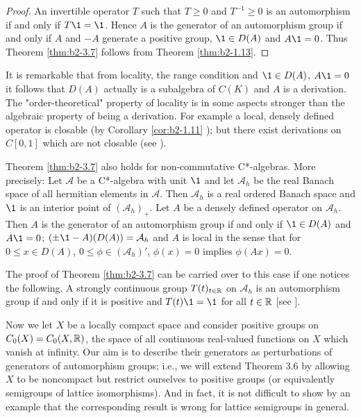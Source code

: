 \begin{proof}
An invertible operator $T$ such that $T \geq 0$ and $T^{-1} \geq 0$ is an automorphism if and only if $T\1 = \1$.
Hence $A$ is the generator of an automorphism group if and only if $A$ and $-A$ generate a positive group, $\1 \in D(A)$ and $A\1 = 0$.
Thus Theorem \ref{thm:b2-3.7} follows from Theorem \ref{thm:b2-1.13}.
\end{proof}

\begin{remark*}\label{rem:b2-3.7a}
It is remarkable that from locality, the range condition and $\1 \in D(A)$, $A\1 = 0$ it follows that $D(A)$ actually is a subalgebra of $C(K)$ and $A$ is a derivation.
The "order-theoretical" property of locality is in some aspects stronger than the algebraic property of being a derivation.
For example a local, densely defined operator is closable (by Corollary \ref{cor:b2-1.11} ); but there exist derivations on $C[0,1]$ which are not closable (see \citet{brattelirobinson:1975}).
\end{remark*}

\begin{remark*}\label{rem:b2-3.7b}
Theorem \ref{thm:b2-3.7} also holds for non-com\-mutative C*-algebras.
More precisely: Let $\mathcal{A}$ be a C*-algebra with unit $\1$ and let $\mathcal{A}_{h}$ be the real Banach space of all hermitian elements in $\mathcal{A}$.
Then $\mathcal{A}_{h}$ is a real ordered Banach space and $\1$ is an interior point of $(\mathcal{A}_{h})_{+}$.
Let $A$ be a densely defined operator on $\mathcal{A}_{h}$.
Then $A$ is the generator of an automorphism group if and only if $\1 \in D(A)$ and $A\1 = 0$; $(\pm\1 - A)(D(A)) = \mathcal{A}_{h}$ and $A$ is local in the sense that for $0 \leq x \in D(A)$, $0 \leq \phi \in (\mathcal{A}_{h})'$, $\phi(x) = 0$ implies $\phi(Ax) = 0$.

The proof of Theorem \ref{thm:b2-3.7} can be carried over to this case if one notices the following.
A strongly continuous group $T(t)_{t \in \mathbb{R}}$ on $\mathcal{A}_{h}$ is an automorphism group if and only if it is positive and $T(t)\1 = \1$ for all $t \in \mathbb{R}$ [see \citet[Corollary 3.2.21]{brattelirobinson:1979}].
\end{remark*}

Now we let $X$ be a locally compact space and consider positive groups on $C_{0}(X) = C_{0}(X,\mathbb{R})$, the space of all continuous real-valued functions on $X$ which vanish at infinity.
Our aim is to describe their generators as perturbations of generators of automorphism groups; i.e., we will extend Theorem 3.6 by allowing $X$ to be noncompact but
restrict ourselves to positive groups (or equivalently semigroups of lattice isomorphisms).
And in fact, it is not difficult to show by an example that the corresponding result is wrong for lattice semigroups in general.

